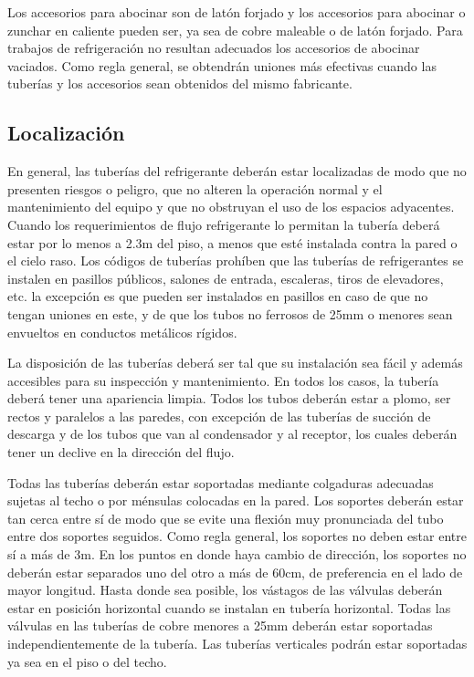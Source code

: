 	Los accesorios para abocinar son de latón forjado y los accesorios para abocinar o zunchar en caliente pueden ser, ya sea de cobre maleable o de latón forjado. Para trabajos de refrigeración no resultan adecuados los accesorios de abocinar vaciados. Como regla general, se obtendrán uniones más efectivas cuando las tuberías y los accesorios sean obtenidos del mismo fabricante.

	\subsection{Localización}

	En general, las tuberías del refrigerante deberán estar localizadas de modo que no presenten riesgos o peligro, que no alteren la operación normal y el mantenimiento del equipo y que no obstruyan el uso de los espacios adyacentes. Cuando los requerimientos de flujo refrigerante lo permitan la tubería deberá estar por lo menos a 2.3m del piso, a menos que esté instalada contra la pared o el cielo raso. Los códigos de tuberías
	 prohíben que las tuberías de refrigerantes se instalen en pasillos públicos, salones de entrada, escaleras, tiros de elevadores, etc. la excepción es que pueden ser instalados en pasillos en caso de que no tengan uniones en este, y de que los tubos no ferrosos de 25mm o menores sean envueltos en conductos metálicos rígidos.

	La disposición de las tuberías deberá ser tal que su instalación sea fácil y además accesibles para su inspección y mantenimiento. En todos los casos, la tubería deberá tener una apariencia limpia. Todos los tubos deberán estar a plomo, ser rectos y paralelos a las paredes, con excepción de las tuberías de succión de descarga y de los tubos que van al condensador y al receptor, los cuales deberán tener un declive en la dirección del flujo.

	Todas las tuberías deberán estar soportadas mediante colgaduras adecuadas sujetas al techo o por ménsulas colocadas en la pared. Los soportes deberán estar tan cerca entre sí de modo que se evite una flexión muy pronunciada del tubo entre dos soportes seguidos. Como regla general, los soportes no deben estar entre sí a más de 3m. En los puntos en donde haya cambio de dirección, los soportes no deberán estar separados uno del otro a más de 60cm, de preferencia en el lado de mayor longitud. Hasta donde sea posible, los vástagos de las válvulas deberán estar en posición horizontal cuando se instalan en tubería horizontal. Todas las válvulas en las tuberías de cobre menores a 25mm deberán estar soportadas independientemente de la tubería. Las tuberías verticales podrán estar soportadas ya sea en el piso o del techo.

